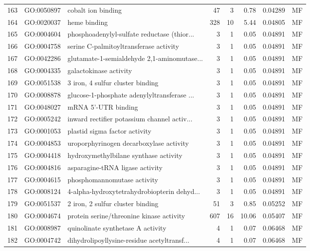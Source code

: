 \documentclass[12pt,oneside,a4paper]{article}
\begin{document}
\begin{longtable}{rllrrrll}
  163 & GO:0050897 & cobalt ion binding &  47 &   3 & 0.78 & 0.04289 & MF \\ 
  164 & GO:0020037 & heme binding & 328 &  10 & 5.44 & 0.04805 & MF \\ 
  165 & GO:0004604 & phosphoadenylyl-sulfate reductase (thior... &   3 &   1 & 0.05 & 0.04891 & MF \\ 
  166 & GO:0004758 & serine C-palmitoyltransferase activity &   3 &   1 & 0.05 & 0.04891 & MF \\ 
  167 & GO:0042286 & glutamate-1-semialdehyde 2,1-aminomutase... &   3 &   1 & 0.05 & 0.04891 & MF \\ 
  168 & GO:0004335 & galactokinase activity &   3 &   1 & 0.05 & 0.04891 & MF \\ 
  169 & GO:0051538 & 3 iron, 4 sulfur cluster binding &   3 &   1 & 0.05 & 0.04891 & MF \\ 
  170 & GO:0008878 & glucose-1-phosphate adenylyltransferase ... &   3 &   1 & 0.05 & 0.04891 & MF \\ 
  171 & GO:0048027 & mRNA 5'-UTR binding &   3 &   1 & 0.05 & 0.04891 & MF \\ 
  172 & GO:0005242 & inward rectifier potassium channel activ... &   3 &   1 & 0.05 & 0.04891 & MF \\ 
  173 & GO:0001053 & plastid sigma factor activity &   3 &   1 & 0.05 & 0.04891 & MF \\ 
  174 & GO:0004853 & uroporphyrinogen decarboxylase activity &   3 &   1 & 0.05 & 0.04891 & MF \\ 
  175 & GO:0004418 & hydroxymethylbilane synthase activity &   3 &   1 & 0.05 & 0.04891 & MF \\ 
  176 & GO:0004816 & asparagine-tRNA ligase activity &   3 &   1 & 0.05 & 0.04891 & MF \\ 
  177 & GO:0004615 & phosphomannomutase activity &   3 &   1 & 0.05 & 0.04891 & MF \\ 
  178 & GO:0008124 & 4-alpha-hydroxytetrahydrobiopterin dehyd... &   3 &   1 & 0.05 & 0.04891 & MF \\ 
  179 & GO:0051537 & 2 iron, 2 sulfur cluster binding &  51 &   3 & 0.85 & 0.05252 & MF \\ 
  180 & GO:0004674 & protein serine/threonine kinase activity & 607 &  16 & 10.06 & 0.05407 & MF \\ 
  181 & GO:0008987 & quinolinate synthetase A activity &   4 &   1 & 0.07 & 0.06468 & MF \\ 
  182 & GO:0004742 & dihydrolipoyllysine-residue acetyltransf... &   4 &   1 & 0.07 & 0.06468 & MF \\ 

\end{longtable}
\end{document}
